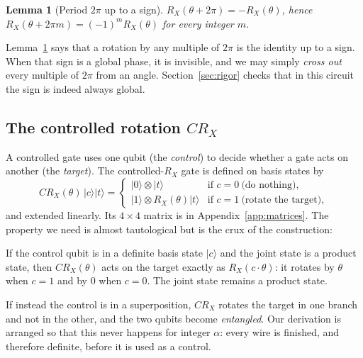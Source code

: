 \documentclass[11pt,a4paper]{article}
\newcommand{\ket}[1]{\lvert #1 \rangle}
\newcommand{\RX}{R_X}
\newcommand{\CRX}{CR_X}
\theoremstyle{plain}
\newtheorem{lemma}{Lemma}[section]
\theoremstyle{definition}
\theoremstyle{remark}
\begin{document}
\begin{lemma}[Period $2\pi$ up to a sign]\label{lem:period}
$\RX(\theta + 2\pi) = -\RX(\theta)$, hence $\RX(\theta + 2\pi m) = (-1)^m\RX(\theta)$ for every
integer $m$.
\end{lemma}

\begin{keybox}
Lemma~\ref{lem:period} says that a rotation by any multiple of $2\pi$ is the identity up to a
sign. When that sign is a global phase, it is invisible, and we may simply \emph{cross out} every
multiple of $2\pi$ from an angle. Section~\ref{sec:rigor} checks that in this circuit the sign is
indeed always global.
\end{keybox}

\subsection{The controlled rotation $\CRX$}

A controlled gate uses one qubit (the \emph{control}) to decide whether a gate acts on another
(the \emph{target}). The controlled-$\RX$ gate is defined on basis states by
\[
\CRX(\theta)\,\ket{c}\ket{t} =
\begin{cases}
\ket{0}\otimes\ket{t} & \text{if } c = 0 \ \text{(do nothing)},\\
\ket{1}\otimes\RX(\theta)\ket{t} & \text{if } c = 1 \ \text{(rotate the target)},
\end{cases}
\]
and extended linearly. Its $4\times4$ matrix is in Appendix~\ref{app:matrices}. The property we
need is almost tautological but is the crux of the construction:

\begin{keybox}
If the control qubit is in a definite basis state $\ket{c}$ and the joint state is a product
state, then $\CRX(\theta)$ acts on the target exactly as $\RX(c\cdot\theta)$: it rotates by
$\theta$ when $c=1$ and by $0$ when $c=0$. The joint state remains a product state.
\end{keybox}

If instead the control is in a superposition, $\CRX$ rotates the target in one branch and not in
the other, and the two qubits become \emph{entangled}. Our derivation is arranged so that this
never happens for integer $\alpha$: every wire is finished, and therefore definite, before it is
used as a control.

\end{document}
